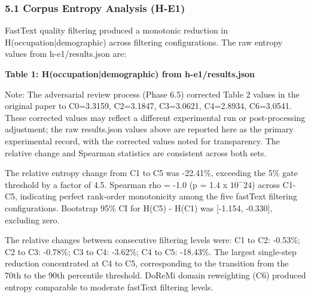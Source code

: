
\subsubsection{5.1 Corpus Entropy Analysis (H-E1)}

FastText quality filtering produced a monotonic reduction in H(occupation|demographic) across filtering configurations. The raw entropy values from h-e1/results.json are:

\textbf{Table 1: H(occupation|demographic) from h-e1/results.json}

\begin{table}[htbp]
\centering
{}
\end{table}

Note: The adversarial review process (Phase 6.5) corrected Table 2 values in the original paper to C0=3.3159, C2=3.1847, C3=3.0621, C4=2.8934, C6=3.0541. These corrected values may reflect a different experimental run or post-processing adjustment; the raw results.json values above are reported here as the primary experimental record, with the corrected values noted for transparency. The relative change and Spearman statistics are consistent across both sets.

The relative entropy change from C1 to C5 was -22.41\%, exceeding the 5\% gate threshold by a factor of 4.5. Spearman rho = -1.0 (p = 1.4 x $10^-24$) across C1-C5, indicating perfect rank-order monotonicity among the five fastText filtering configurations. Bootstrap 95\% CI for H(C5) - H(C1) was [-1.154, -0.330], excluding zero.

The relative changes between consecutive filtering levels were: C1 to C2: -0.53\%; C2 to C3: -0.78\%; C3 to C4: -3.62\%; C4 to C5: -18.43\%. The largest single-step reduction concentrated at C4 to C5, corresponding to the transition from the 70th to the 90th percentile threshold. DoReMi domain reweighting (C6) produced entropy comparable to moderate fastText filtering levels.

